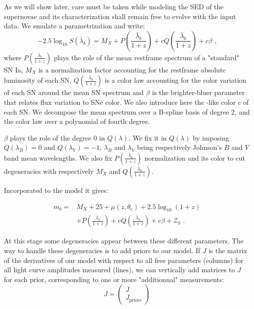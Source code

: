 \documentclass[\docopts]{\docclass}
\begin{document}
As we will show later, care must be taken while modeling the SED of the supernovae and its characterization shall remain free to evolve with the input data.
We emulate a  parametrization and write:
\begin{equation}
-2.5\log_{10}S(\bar\lambda_b) = M_X + P(\frac{\bar\lambda_b}{1+z}) + cQ(\frac{\bar\lambda_b}{1+z}) + c\beta \text{ ,}
\end{equation}
where $P(\frac{\bar\lambda_b}{1+z})$ plays the role of the mean restframe spectrum of a "standard" SN Ia, $M_X$ is a normalization factor accounting for the restframe absolute luminosity of each SN, $Q(\frac{\bar\lambda_b}{1+z})$ is a color law accounting for the color variation of each SN around the mean SN spectrum and $\beta$ is the brighter-bluer parameter that relates flux variation to SNe color.
We also introduce here the -like color $c$ of each SN.
We decompose the mean spectrum over a B-spline basis of degree 2, and the color law over a polynomial of fourth degree.

$\beta$ plays the role of the degree 0 in $Q( \lambda )$. We fix it in $Q( \lambda )$ by imposing $Q(\lambda_B) = 0$ and $Q(\lambda_V) = -1$, $\lambda_B$ and $\lambda_V$ being respectively Johnson's $B$ and $V$ band mean wavelengths.
We also fix $P(\frac{\bar\lambda_b}{1+z})$ normalization and its color to cut degeneracies with respectively $M_X$ and $Q(\frac{\bar\lambda_b}{1+z})$.

Incorporated to the model it gives:

\begin{equation}
\begin{split}
\label{eq::model}
m_b = &M_X + 25 + \mu(z, \theta_\text{c}) + 2.5\log_{10}(1+z) \\
&+ P(\frac{\bar\lambda_b }{1+z}) + cQ(\frac{\bar\lambda_b }{1+z}) + c\beta + \mathcal{Z}_b \text{ .}
\end{split}
\end{equation}

At this stage some degeneracies appear between these different parameters.
The way to handle these degeneracies is to add priors to our model.
If $J$ is the matrix of the derivatives  of our model with respect to all free parameters (columns) for all light curve amplitudes measured (lines), we can vertically add matrices to $J$ for each prior, corresponding to one or more "additionnal" measurements:
\begin{equation}
J =
\begin{pmatrix}
  J \\
  J_\text{priors}
\end{pmatrix} 
\end{equation}
\end{document}
